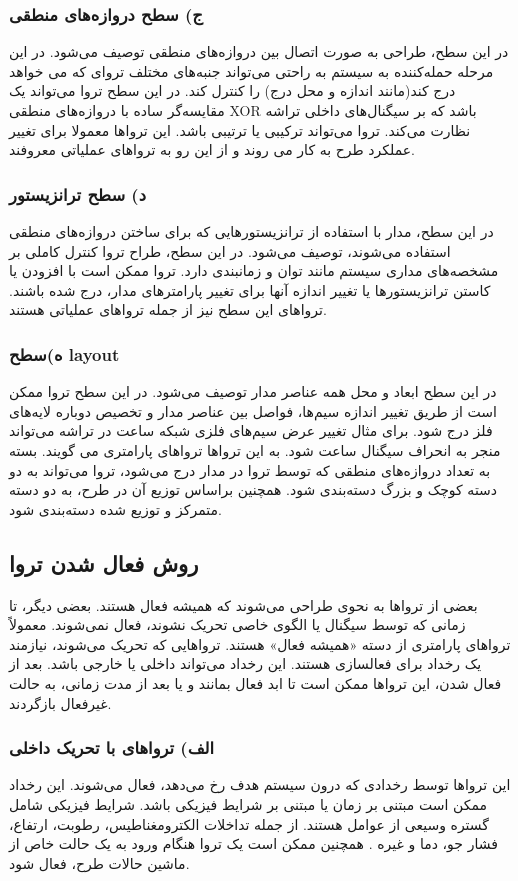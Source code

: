 \subsubsection {ج) سطح دروازه‌های منطقی}
در این سطح، طراحی به صورت اتصال بین دروازه‌های منطقی توصیف می‌شود. در این مرحله حمله‌کننده به سیستم به راحتی می‌تواند جنبه‌های مختلف تروای که می خواهد درج کند(مانند اندازه و محل درج) را کنترل کند.  در این سطح تروا می‌تواند یک مقایسه‌گر ساده با دروازه‌های منطقی XOR باشد که بر سیگنال‌های داخلی تراشه نظارت می‌کند. تروا می‌تواند ترکیبی یا ترتیبی باشد. این تروا‌ها معمولا برای تغییر عملکرد طرح به کار می روند و از این رو به تروا‌های عملیاتی معروفند.
\subsubsection {د) سطح ترانزیستور}
در این سطح، مدار با استفاده از  ترانزیستورهایی که برای ساختن دروازه‌های منطقی استفاده می‌شوند، توصیف می‌شود. در این سطح، طراح تروا کنترل کاملی بر مشخصه‌های مداری سیستم مانند توان و زمانبندی دارد. تروا ممکن است با افزودن یا کاستن ترانزیستورها یا تغییر اندازه آنها برای تغییر پارامترهای مدار، درج شده باشند. تروا‌های این سطح نیز از جمله تروا‌های عملیاتی هستند.
\subsubsection {ه)سطح layout}
در این سطح ابعاد و محل همه عناصر مدار توصیف می‌شود. در این سطح تروا ممکن است از طریق تغییر اندازه سیم‌ها، فواصل بین عناصر مدار و تخصیص دوباره لایه‌های فلز درج شود. برای مثال تغییر عرض سیم‌های فلزی شبکه ساعت در تراشه می‌تواند منجر به انحراف سیگنال ساعت شود. به این تروا‌ها تروا‌های پارامتری می گویند. 
بسته به تعداد دروازه‌های منطقی که توسط تروا در مدار درج می‌شود، تروا می‌تواند به دو دسته کوچک و بزرگ دسته‌بندی شود. همچنین براساس توزیع آن در طرح، به دو دسته متمرکز و توزیع شده دسته‌بندی شود.

\subsection{روش فعال شدن تروا}
بعضی از تروا‌ها به نحوی طراحی می‌شوند که همیشه فعال هستند. بعضی دیگر، تا زمانی که توسط سیگنال یا الگوی خاصی تحریک نشوند، فعال نمی‌شوند.  معمولاً تروا‌های پارامتری از دسته «همیشه فعال» هستند. تروا‌هایی که تحریک می‌شوند، نیازمند یک رخداد برای فعالسازی هستند.  این رخداد می‌تواند داخلی یا خارجی باشد. بعد از فعال شدن، این تروا‌ها ممکن است تا ابد فعال بمانند و یا بعد از مدت زمانی، به حالت غیرفعال بازگردند.
\subsubsection {الف) تروا‌های با تحریک داخلی}
این تروا‌ها توسط رخدادی که درون سیستم هدف رخ می‌دهد، فعال می‌شوند. این رخداد ممکن است مبتنی بر زمان یا مبتنی بر شرایط فیزیکی باشد. شرایط فیزیکی شامل گستره وسیعی از عوامل هستند. از جمله تداخلات الکترومغناطیس، رطوبت، ارتفاع، فشار جو، دما و غیره . همچنین ممکن است یک تروا هنگام ورود به یک حالت خاص از ماشین حالات طرح، فعال شود.
